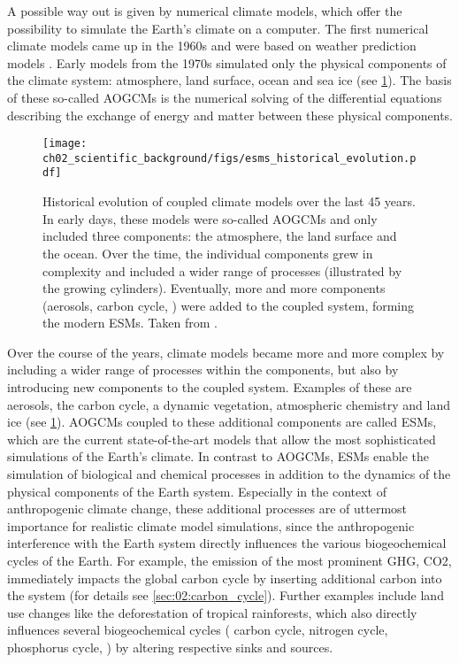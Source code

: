 A possible way out is given by numerical climate models, which offer the
possibility to simulate the Earth's climate on a computer. The first numerical
climate models came up in the 1960s and were based on weather prediction models
\autocite{Flato2011}. Early models from the 1970s simulated only the physical
components of the climate system: atmosphere, land surface, ocean and sea ice
(see \cref{fig:02:esms_historical_evolution}). The basis of these so-called
\acp{AOGCM} \autocite{Flato2013} is the numerical solving of the differential
equations describing the exchange of energy and matter between these physical
components.

\begin{figure}[t]
  \centering
  \texttt{[image: 
    ch02\_scientific\_background/figs/esms\_historical\_evolution.pdf]}
  \caption{Historical evolution of coupled climate models over the last 45
    years. In early days, these models were so-called \acfp{AOGCM} and only
    included three components: the atmosphere, the land surface and the ocean.
    Over the time, the individual components grew in complexity and included a
    wider range of processes (illustrated by the growing cylinders).
    Eventually, more and more components (aerosols, carbon cycle, \etc{}) were
    added to the coupled system, forming the modern \acfp{ESM}. Taken from
    \textcite{Cubasch2013}.}
  \label{fig:02:esms_historical_evolution}
\end{figure}

Over the course of the years, climate models became more and more complex by
including a wider range of processes within the components, but also by
introducing new components to the coupled system. Examples of these are
aerosols, the carbon cycle, a dynamic vegetation, atmospheric chemistry and
land ice (see \cref{fig:02:esms_historical_evolution}). \acp{AOGCM} coupled to
these additional components are called \acfp{ESM}, which are the current
state-of-the-art models that allow the most sophisticated simulations of the
Earth's climate. In contrast to \acp{AOGCM}, \acp{ESM} enable the simulation of
biological and chemical processes in addition to the dynamics of the physical
components of the Earth system. Especially in the context of anthropogenic
climate change, these additional processes are of uttermost importance for
realistic climate model simulations, since the anthropogenic interference with
the Earth system directly influences the various biogeochemical cycles of the
Earth. For example, the emission of the most prominent \ac{GHG}, \ac{CO2},
immediately impacts the global carbon cycle by inserting additional carbon into
the system (for details see \cref{sec:02:carbon_cycle}). Further examples
include land use changes like the deforestation of tropical rainforests, which
also directly influences several biogeochemical cycles (\eg{} carbon cycle,
nitrogen cycle, phosphorus cycle, \etc{}) by altering respective sinks and
sources.

